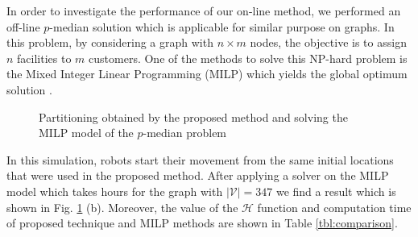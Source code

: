 \documentclass[smallcondensed]{svjour3}
\begin{document}
In order to investigate the performance of our on-line method, we performed an off-line $p$-median solution \cite{Daskin2015} which is applicable for similar purpose on graphs. In this problem, by considering a graph with $n \times m$ nodes, the objective is to assign $n$ facilities to $m$ customers. One of the methods to solve this NP-hard problem is the Mixed Integer Linear Programming (MILP) which yields the global optimum solution \cite{Edson2005}.

\begin{figure}[H]
	\centering	
	\caption{Partitioning obtained by the proposed method and solving the MILP model of the $p$-median problem}
	\label{fig:googledeployed}
\end{figure}

In this simulation, robots start their movement from the same initial locations that were used in the proposed method. After applying a solver on the MILP model which takes hours for the graph with $|\mathcal{V}|=347$ we find a result which is shown in Fig. \ref{fig:googledeployed} (b). Moreover, the value of the $\mathcal{H}$ function and computation time of proposed technique and MILP methods are shown in Table \ref{tbl:comparison}.
\end{document}
